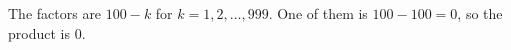 The factors are $100-k$ for $k=1,2,\dots,999$. One of them is $100-100=0$, so the product is $\boxed{0}$.
